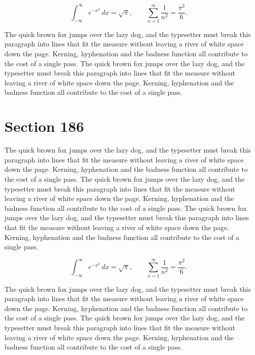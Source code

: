 \documentclass{article}
\begin{document}
\begin{equation}
\int_{-\infty}^{\infty} e^{-x^{2}}\,dx = \sqrt{\pi}, \qquad
\sum_{n=1}^{\infty} \frac{1}{n^{2}} = \frac{\pi^{2}}{6}.
\end{equation}

The quick brown fox jumps over the lazy dog, and the typesetter must break this paragraph into lines that fit the measure without leaving a river of white space down the page. Kerning, hyphenation and the badness function all contribute to the cost of a single pass. The quick brown fox jumps over the lazy dog, and the typesetter must break this paragraph into lines that fit the measure without leaving a river of white space down the page. Kerning, hyphenation and the badness function all contribute to the cost of a single pass. 
\section{Section 186}
The quick brown fox jumps over the lazy dog, and the typesetter must break this paragraph into lines that fit the measure without leaving a river of white space down the page. Kerning, hyphenation and the badness function all contribute to the cost of a single pass. The quick brown fox jumps over the lazy dog, and the typesetter must break this paragraph into lines that fit the measure without leaving a river of white space down the page. Kerning, hyphenation and the badness function all contribute to the cost of a single pass. The quick brown fox jumps over the lazy dog, and the typesetter must break this paragraph into lines that fit the measure without leaving a river of white space down the page. Kerning, hyphenation and the badness function all contribute to the cost of a single pass. 

\begin{equation}
\int_{-\infty}^{\infty} e^{-x^{2}}\,dx = \sqrt{\pi}, \qquad
\sum_{n=1}^{\infty} \frac{1}{n^{2}} = \frac{\pi^{2}}{6}.
\end{equation}

The quick brown fox jumps over the lazy dog, and the typesetter must break this paragraph into lines that fit the measure without leaving a river of white space down the page. Kerning, hyphenation and the badness function all contribute to the cost of a single pass. The quick brown fox jumps over the lazy dog, and the typesetter must break this paragraph into lines that fit the measure without leaving a river of white space down the page. Kerning, hyphenation and the badness function all contribute to the cost of a single pass. 
\end{document}
